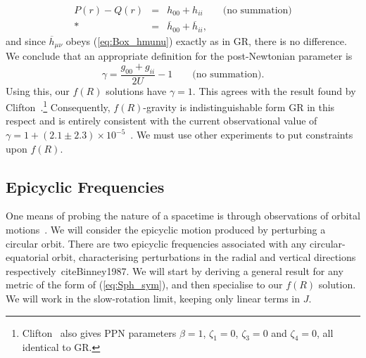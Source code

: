 \documentclass[aps,prd,amsfonts,amssymb,amsmath,nofootinbib,reprint,showpacs]{revtex4-1}
\newcommand{\eqnref}[1]{(\ref{eq:#1})}
\begin{document}
\begin{eqnarray}
P(r) - Q(r) & = & h_{00} + h_{ii} \qquad \text{(no summation)}\nonumber \\*
 & = & \overline{h}_{00} + \overline{h}_{ii},
\end{eqnarray}
and since $\overline{h}_{\mu\nu}$ obeys \eqnref{Box_hmunu} exactly as in GR, there is no difference. We conclude that an appropriate definition for the post-Newtonian parameter is
\begin{equation}
\gamma = \frac{g_{00} + g_{ii}}{2U} - 1 \qquad \text{(no summation)}.
\end{equation}
Using this, our $f(R)$ solutions have $\gamma = 1$. This agrees with the result found by Clifton~\cite{Clifton2008}.\footnote{Clifton~\cite{Clifton2008} also gives PPN parameters $\beta =1$, $\zeta_1 = 0$, $\zeta_3 = 0$ and $\zeta_4 = 0$, all identical to GR.} Consequently, $f(R)$-gravity is indistinguishable form GR in this respect and is entirely consistent with the current observational value of $\gamma = 1 + (2.1 \pm 2.3) \times 10^{-5}$~\cite{Will2006, Bertotti2003}. We must use other experiments to put constraints upon $f(R)$.

\subsection{Epicyclic Frequencies\label{sec:Epicycle}}

One means of probing the nature of a spacetime is through observations of orbital motions~\cite{Gair2008a}. We will consider the epicyclic motion produced by perturbing a circular orbit. There are two epicyclic frequencies associated with any circular-equatorial orbit, characterising perturbations in the radial and vertical directions respectively~cite{Binney1987}. We will start by deriving a general result for any metric of the form of \eqnref{Sph_sym}, and then specialise to our $f(R)$ solution. We will work in the slow-rotation limit, keeping only linear terms in $J$.
\end{document}
